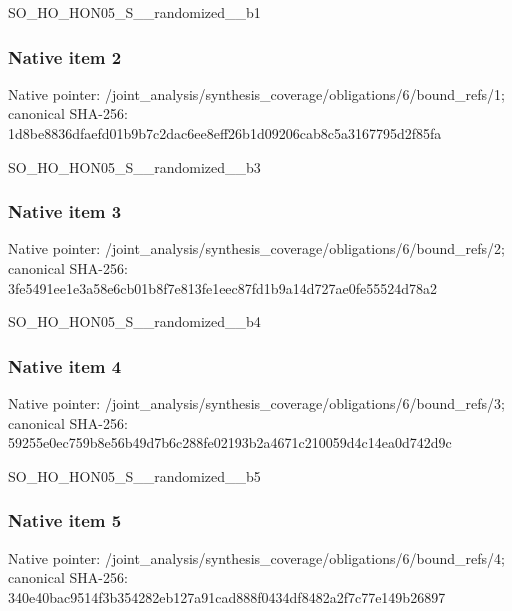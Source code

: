 \documentclass[10pt,a4paper]{article}
\begin{document}
\begingroup\raggedright\sloppy SO\_\allowbreak{}HO\_\allowbreak{}HON05\_\allowbreak{}S\_\allowbreak{}\_\allowbreak{}randomized\_\allowbreak{}\_\allowbreak{}b1\par\endgroup

\subsubsection{Native item 2}
Native pointer: /joint\_\allowbreak{}analysis/synthesis\_\allowbreak{}coverage/obligations/6/bound\_\allowbreak{}refs/1; canonical SHA-256: 1d8be8836dfaefd01b9b7c2dac6ee8eff26b1d09206cab8c5a3167795d2f85fa

\begingroup\raggedright\sloppy SO\_\allowbreak{}HO\_\allowbreak{}HON05\_\allowbreak{}S\_\allowbreak{}\_\allowbreak{}randomized\_\allowbreak{}\_\allowbreak{}b3\par\endgroup

\subsubsection{Native item 3}
Native pointer: /joint\_\allowbreak{}analysis/synthesis\_\allowbreak{}coverage/obligations/6/bound\_\allowbreak{}refs/2; canonical SHA-256: 3fe5491ee1e3a58e6cb01b8f7e813fe1eec87fd1b9a14d727ae0fe55524d78a2

\begingroup\raggedright\sloppy SO\_\allowbreak{}HO\_\allowbreak{}HON05\_\allowbreak{}S\_\allowbreak{}\_\allowbreak{}randomized\_\allowbreak{}\_\allowbreak{}b4\par\endgroup

\subsubsection{Native item 4}
Native pointer: /joint\_\allowbreak{}analysis/synthesis\_\allowbreak{}coverage/obligations/6/bound\_\allowbreak{}refs/3; canonical SHA-256: 59255e0ec759b8e56b49d7b6c288fe02193b2a4671c210059d4c14ea0d742d9c

\begingroup\raggedright\sloppy SO\_\allowbreak{}HO\_\allowbreak{}HON05\_\allowbreak{}S\_\allowbreak{}\_\allowbreak{}randomized\_\allowbreak{}\_\allowbreak{}b5\par\endgroup

\subsubsection{Native item 5}
Native pointer: /joint\_\allowbreak{}analysis/synthesis\_\allowbreak{}coverage/obligations/6/bound\_\allowbreak{}refs/4; canonical SHA-256: 340e40bac9514f3b354282eb127a91cad888f0434df8482a2f7c77e149b26897
\end{document}

